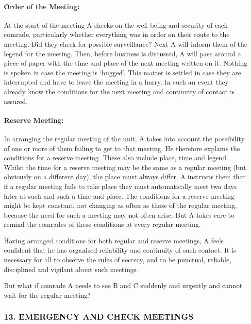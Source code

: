 \paragraph{Order of the Meeting:}

At the start of the meeting A checks on the well-being and security of
each comrade, particularly whether everything was in order on their
route to the meeting. Did they check for possible surveillance? Next A
will inform them of the legend for the meeting. Then, before business is
discussed, A will pass around a piece of paper with the time and place
of the next meeting written on it. Nothing is spoken in case the meeting
is `bugged'. This matter is settled in case they are interrupted and
have to leave the meeting in a hurry. In such an event they already know
the conditions for the next meeting and continuity of contact is
assured.

\paragraph{Reserve Meeting:}

In arranging the regular meeting of the unit, A takes into account the
possibility of one or more of them failing to get to that meeting. He
therefore explains the conditions for a reserve meeting. These also
include place, time and legend. Whilst the time for a reserve meeting
may be the same as a regular meeting (but obviously on a different day),
the place must always differ. A instructs them that if a regular meeting
fails to take place they must automatically meet two days later at
such-and-such a time and place. The conditions for a reserve meeting
might be kept constant, not changing as often as those of the regular
meeting, because the need for such a meeting may not often arise. But A
takes care to remind the comrades of these conditions at every regular
meeting.

Having arranged conditions for both regular and reserve meetings, A
feels confident that he has organised reliability and continuity of such
contact. It is necessary for all to observe the rules of secrecy, and to
be punctual, reliable, disciplined and vigilant about such meetings.

But what if comrade A needs to see B and C suddenly and urgently and
cannot wait for the regular meeting?

\subsubsection{13. EMERGENCY AND CHECK MEETINGS}

